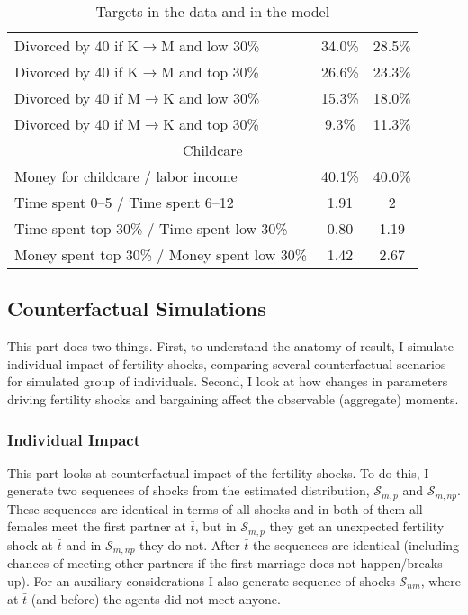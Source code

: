 \documentclass[12pt,letter]{article}
\begin{document}
\begin{table}
\begin{center}
\begin{tabular}{|l|c|c|}
Divorced by 40 if K$\to$M and low 30\% & 34.0\% & 28.5\% \\
Divorced by 40 if K$\to$M and top 30\% & 26.6\% & 23.3\% \\
Divorced by 40 if M$\to$K and low 30\% & 15.3\% & 18.0\% \\
Divorced by 40 if M$\to$K and top 30\% & 9.3\% & 11.3\% \\\hline
\multicolumn{3}{|c|}{Childcare} \\\hline
Money for childcare / labor income & 40.1\% & 40.0\% \\
Time spent 0--5 / Time spent 6--12 & 1.91 & 2 \\
Time spent top 30\% / Time spent low 30\% & 0.80 & 1.19 \\
Money spent top 30\% / Money spent low 30\% & 1.42 & 2.67 \\\hline
\end{tabular}
\caption{Targets in the data and in the model\label{targets-main}}
\end{center}
\end{table}

\subsection{Counterfactual Simulations}

This part does two things. First, to understand the anatomy of result, I simulate individual impact of fertility shocks, comparing several counterfactual scenarios for simulated group of individuals. Second, I look at how changes in parameters driving fertility shocks and bargaining affect the observable (aggregate) moments.

\subsubsection{Individual Impact}

This part looks at counterfactual impact of the fertility shocks. To do this, I generate two sequences of shocks from the estimated distribution, $\mathcal{S}_{m,p}$ and $\mathcal{S}_{m,np}$. These sequences are identical in terms of all shocks and in both of them all females meet the first partner at $\bar{t}$, but in $\mathcal{S}_{m,p}$ they get an unexpected fertility shock at $\bar{t}$ and in $\mathcal{S}_{m,np}$ they do not. After $\bar{t}$ the sequences are identical (including chances of meeting other partners if the first marriage does not happen/breaks up).  For an auxiliary considerations I also generate sequence of shocks $\mathcal{S}_{nm}$, where at $\bar{t}$ (and before) the agents did not meet anyone. 
\end{document}
